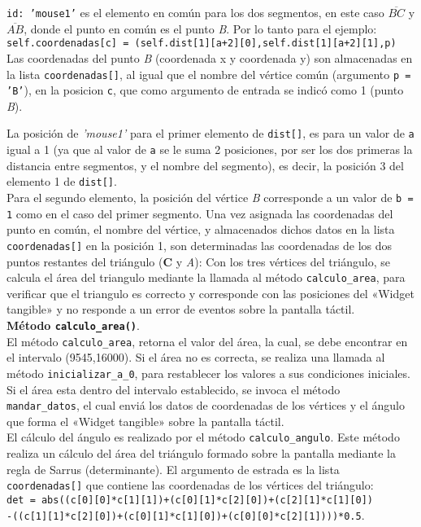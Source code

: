 \texttt{id: 'mouse1'} es el elemento en común para los dos segmentos, en este caso $\overline{BC}$ y $\overline{AB}$, donde el punto en común es el punto \textit{B}. Por lo tanto para el ejemplo:\\

\texttt{self.coordenadas[c] = (self.dist[1][a+2][0],self.dist[1][a+2][1],p)}\\

Las coordenadas del punto \textit{B} (coordenada x y coordenada y) son almacenadas en la lista \texttt{coordenadas[]}, al igual que el nombre del vértice común (argumento \texttt{p = 'B'}), en la posicion \texttt{c}, que como argumento de entrada se indicó como 1 (punto \textit{B}). 

La posición de \textit{'mouse1'} para el primer elemento de \texttt{dist[]}, es para un valor de \texttt{a} igual a 1 (ya que al valor de \texttt{a} se le suma 2 posiciones, por ser los dos primeras la distancia entre segmentos, y el nombre del segmento), es decir, la posición 3 del elemento 1 de \texttt{dist[]}.\\

Para el segundo elemento, la posición del vértice \textit{B} corresponde a un valor de \texttt{b = 1} como en el caso del primer segmento.
Una vez asignada las coordenadas del punto en común, el nombre del vértice, y almacenados dichos datos en la lista \texttt{coordenadas[]} en la posición 1, son determinadas las coordenadas de los dos puntos restantes del triángulo (\textbf{C} y \textit{A}): 
Con los tres vértices del triángulo, se calcula el área del triangulo mediante la llamada al método \texttt{calculo\_area}, para verificar que el triangulo es correcto y corresponde con las posiciones del «Widget tangible» y no responde a un error de eventos sobre la pantalla táctil.\\

\textbf{Método \texttt{calculo\_area()}}.\\
El método \texttt{calculo\_area}, retorna el valor del área, la cual, se debe encontrar en el intervalo (9545,16000). 
Si el área no es correcta, se realiza una llamada al método \texttt{inicializar\_a\_0}, para restablecer los valores a sus condiciones iniciales. 
Si el área esta dentro del intervalo establecido, se invoca el método \texttt{mandar\_datos}, el cual enviá los datos de coordenadas de los vértices y el ángulo que forma el «Widget tangible» sobre la pantalla táctil.\\ 
El cálculo del ángulo es realizado por el método \texttt{calculo\_angulo}.
Este método realiza un cálculo del área del triángulo formado sobre la pantalla mediante la regla de Sarrus (determinante).
El argumento de estrada es la lista \texttt{coordenadas[]} que contiene las coordenadas de los vértices del triángulo:\\
\texttt{det = abs((c[0][0]*c[1][1])+(c[0][1]*c[2][0])+(c[2][1]*c[1][0])}\\
\texttt{-((c[1][1]*c[2][0])+(c[0][1]*c[1][0])+(c[0][0]*c[2][1])))*0.5}.\\



